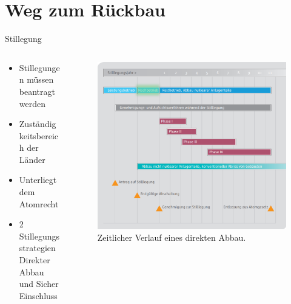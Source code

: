 \section{Weg zum Rückbau}



\begin{frame}{ Stillegung }
   \begin{columns}

    \begin{column}{0.48\textwidth}
      \begin{itemize}
       \setlength\itemsep{1.2em}
         \item{ Stillegungen müssen beantragt werden}
         \item{ Zuständigkeitsbereich der Länder}
         \item{ Unterliegt dem Atomrecht}
         \item{ 2 Stillegungsstrategien \\ Direkter Abbau und Sicher Einschluss}
      \end{itemize}
    \end{column}

    \begin{column}{0.48\textwidth}
      \begin{figure}
        \centering
        \includegraphics[width=1.05\textwidth]{./bilder/stilllegung_nachbetrieb.pdf}
        \caption{ Zeitlicher Verlauf eines direkten Abbau\cite{stilllegung_grs}. }
        \label{ fig: stillegung }
      \end{figure}
    \end{column}

  \end{columns}
\end{frame}



